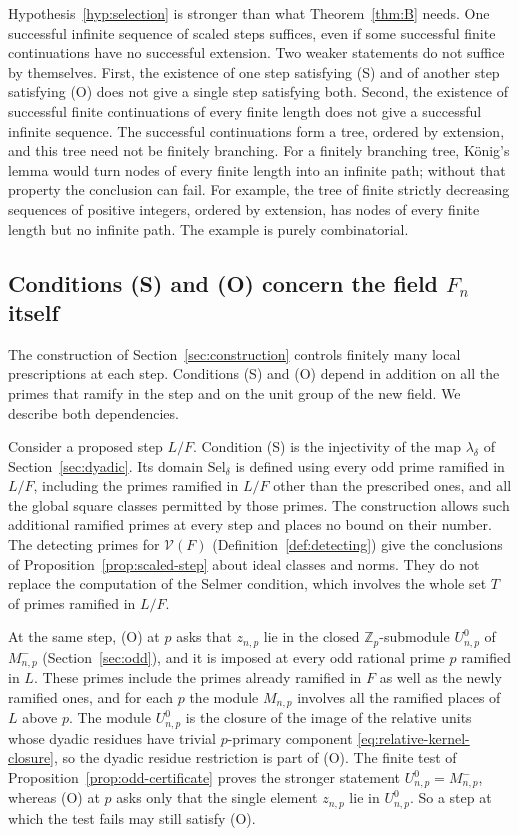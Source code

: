 \documentclass[11pt]{article}
\theoremstyle{plain}
\theoremstyle{definition}
\theoremstyle{remark}
\newcommand{\Z}{\mathbb Z}
\begin{document}
Hypothesis~\ref{hyp:selection} is stronger than what Theorem~\ref{thm:B}
needs.  One successful infinite sequence of scaled steps suffices, even
if some successful finite continuations have no successful extension.
Two weaker statements do not suffice by themselves.  First, the existence
of one step satisfying (S) and of another step satisfying (O) does not
give a single step satisfying both.  Second, the existence of successful
finite continuations of every finite length does not give a successful
infinite sequence.  The successful continuations form a tree, ordered by
extension, and this tree need not be finitely branching.  For a
finitely branching tree, K\"onig's lemma would turn nodes of every finite
length into an infinite path; without that property the conclusion can
fail.  For example, the tree of finite strictly decreasing sequences of
positive integers, ordered by extension, has nodes of every finite length
but no infinite path.  The example is purely combinatorial.

\subsection{Conditions (S) and (O) concern the field \texorpdfstring{$F_n$}{F\_n} itself}
\label{sec:selection-field}
The construction of Section~\ref{sec:construction} controls finitely many
local prescriptions at each step.  Conditions (S) and (O) depend in
addition on all the primes that ramify in the step and on the unit group
of the new field.  We describe both dependencies.

Consider a proposed step $L/F$.  Condition (S) is the injectivity of the
map $\lambda_\delta$ of Section~\ref{sec:dyadic}.  Its domain
$\mathrm{Sel}_\delta$ is defined using every odd prime ramified in
$L/F$, including the primes ramified in $L/F$ other than the prescribed
ones, and all the global square classes permitted by those primes.  The
construction allows such additional ramified primes at every step and
places no bound on their number.  The detecting primes for $\mathcal
V(F)$ (Definition~\ref{def:detecting}) give the conclusions of
Proposition~\ref{prop:scaled-step} about ideal classes and norms.  They do
not replace the computation of the Selmer condition, which involves the
whole set $T$ of primes ramified in $L/F$.

At the same step, (O) at $p$ asks that $z_{n,p}$ lie in the closed
$\Z_p$-submodule $U_{n,p}^0$ of $M_{n,p}^-$ (Section~\ref{sec:odd}), and
it is imposed at every odd rational prime $p$ ramified in $L$.  These
primes include the primes already ramified in $F$ as well as the newly
ramified ones, and for each $p$ the module $M_{n,p}$ involves all the
ramified places of $L$ above $p$.  The module $U^0_{n,p}$ is the closure
of the image of the relative units whose dyadic residues have trivial
$p$-primary component \eqref{eq:relative-kernel-closure}, so the dyadic
residue restriction is part of (O).  The finite
test of Proposition~\ref{prop:odd-certificate} proves the stronger
statement $U_{n,p}^0=M_{n,p}^-$, whereas (O) at $p$ asks
only that the single element $z_{n,p}$ lie in $U^0_{n,p}$.  So a step at
which the test fails may still satisfy (O).
\end{document}
